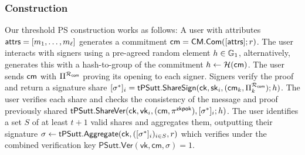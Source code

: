 \subsubsection{Construction}\label{threshold-ps-construction}


Our threshold PS construction works as follows:
A user with attributes $\mathsf{attrs} = [m_1, \ldots, m_\ell]$ generates a commitment $\mathsf{cm} = \mathsf{CM.Com}([\mathsf{attrs}];r)$. The user interacts with signers using a pre-agreed random element $h \in \mathbb{G}_1$, alternatively, \cite{sonnino_coconut_2020} generates this with a hash-to-group of the commitment $h \gets \mathcal{H}(\mathsf{cm})$. The user sends $\mathsf{cm}$ with $\Pi^{\mathcal{R}_{\mathsf{com}}}$ proving its opening to each signer. Signers verify the proof and return a signature share $[\sigma^*]_i = \mathsf{tPSutt.ShareSign}(\mathsf{ck}, \mathsf{sk}_i, (\mathsf{cm}_k, \Pi^{\mathcal{R}_{\mathsf{com}}}_k); h)$. The user verifies each share and checks the consistency of the message and proof previously shared $\mathsf{tPSutt.ShareVer}(\mathsf{ck}, \mathsf{vk}_i, (\mathsf{cm}, \pi^{\mathsf{zkpok}}), [\sigma^*]_i; h)$. The user identifies a set $S$ of at least $t+1$ valid shares and aggregates them, outputting their signature $\sigma \leftarrow \mathsf{tPSutt.Aggregate}(\mathsf{ck}, ([\sigma^*]_i)_{i \in S}, r)$ which verifies under the combined  verification key $\mathsf{PSutt.Ver}(\mathsf{vk}, \mathsf{cm}, \sigma) = 1$.


